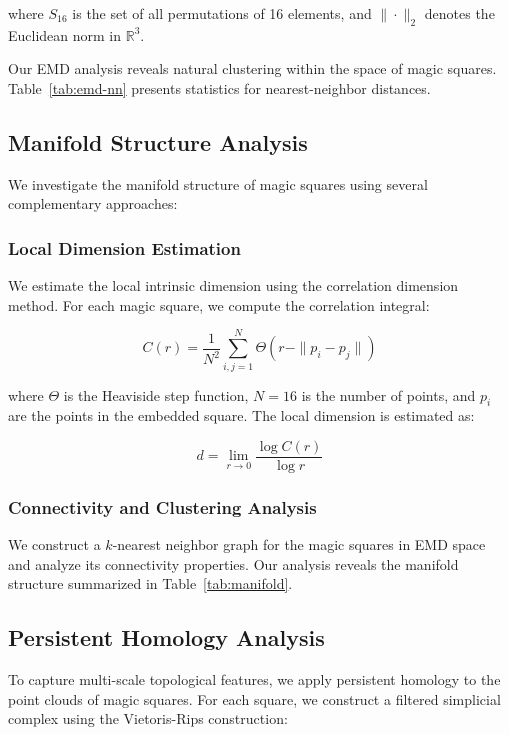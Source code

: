 where $S_{16}$ is the set of all permutations of 16 elements, and $\|\cdot\|_2$ denotes the Euclidean norm in $\mathbb{R}^3$.

Our EMD analysis reveals natural clustering within the space of magic squares. Table~\ref{tab:emd-nn} presents statistics for nearest-neighbor distances.



\subsection{Manifold Structure Analysis}

We investigate the manifold structure of magic squares using several complementary approaches:

\subsubsection{Local Dimension Estimation}

We estimate the local intrinsic dimension using the correlation dimension method. For each magic square, we compute the correlation integral:

\[
C(r) = \frac{1}{N^2} \sum_{i,j=1}^N \Theta(r - \|p_i - p_j\|)
\]

where $\Theta$ is the Heaviside step function, $N = 16$ is the number of points, and $p_i$ are the points in the embedded square. The local dimension is estimated as:

\[
d = \lim_{r \to 0} \frac{\log C(r)}{\log r}
\]

\subsubsection{Connectivity and Clustering Analysis}

We construct a $k$-nearest neighbor graph for the magic squares in EMD space and analyze its connectivity properties. Our analysis reveals the manifold structure summarized in Table~\ref{tab:manifold}.



\subsection{Persistent Homology Analysis}

To capture multi-scale topological features, we apply persistent homology to the point clouds of magic squares. For each square, we construct a filtered simplicial complex using the Vietoris-Rips construction:

